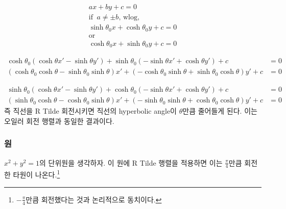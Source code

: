 \documentclass{thesis-SJ}
\begin{document}
\begin{gather*}
ax + by + c = 0\\
\text{if}\phantom{a} a\neq \pm b\text{, wlog, }\\
\sinh{\theta_0} x + \cosh{\theta_0} y + c = 0 \\
\text{or}\\
\cosh{\theta_0} x + \sinh{\theta_0} y + c = 0
\end{gather*}

\begin{align*}
\cosh{\theta_0}(\cosh\theta x' - \sinh\theta y') + \sinh{\theta_0}(-\sinh{\theta} x' +\cosh{\theta} y')+c&=0\\
(\cosh{\theta_0}\cosh\theta- \sinh{\theta_0}\sinh{\theta})x'+(-\cosh{\theta_0}\sinh\theta+\sinh{\theta_0}\cosh{\theta} )y'+c&=0
\end{align*}

\begin{align*}
\sinh{\theta_0}(\cosh\theta x' - \sinh\theta y') + \cosh{\theta_0}(-\sinh{\theta} x' +\cosh{\theta} y')+c&=0\\
(\sinh{\theta_0}\cosh\theta- \cosh{\theta_0}\sinh{\theta})x'+(-\sinh{\theta_0}\sinh\theta+\cosh{\theta_0}\cosh{\theta} )y'+c&=0
\end{align*}
즉 직선을 R Tilde 회전시키면 직선의 hyperbolic angle이 $\theta$만큼 줄어들게 된다. 이는 오일러 회전 행렬과 동일한 결과이다.

\subsubsection{원}

$x^2+y^2=1$의 단위원을 생각하자. 이 원에 R Tilde 행렬을 적용하면 이는 $\frac{\pi}{4}$만큼 회전한 타원이 나온다.\footnote{$-\frac{\pi}{4}$만큼 회전했다는 것과 논리적으로 동치이다.}
\end{document}
